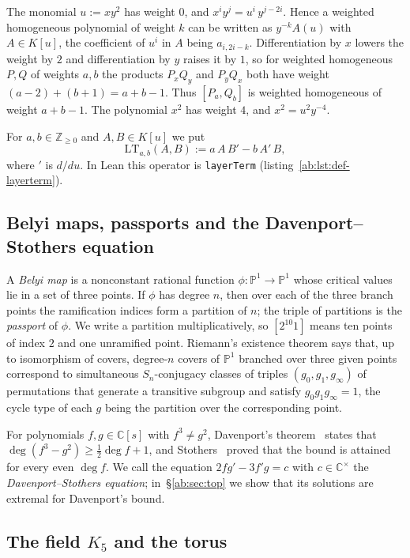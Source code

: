 \documentclass[a4paper,11pt]{article}
\theoremstyle{jsplain}
\theoremstyle{jsdef}
\theoremstyle{jsrem}
\begin{document}
The monomial $u:=xy^2$ has weight $0$, and $x^iy^j=u^i\,y^{j-2i}$. Hence a weighted homogeneous polynomial of weight $k$ can be written as $y^{-k}A(u)$ with $A\in K[u]$, the coefficient of $u^i$ in $A$ being $a_{i,2i-k}$. Differentiation by $x$ lowers the weight by $2$ and differentiation by $y$ raises it by $1$, so for weighted homogeneous $P,Q$ of weights $a,b$ the products $P_xQ_y$ and $P_yQ_x$ both have weight $(a-2)+(b+1)=a+b-1$. Thus $[P_a,Q_b]$ is weighted homogeneous of weight $a+b-1$. The polynomial $x^2$ has weight $4$, and $x^2=u^2y^{-4}$.

For $a,b\in\mathbb{Z}_{\ge0}$ and $A,B\in K[u]$ we put
\[
\mathrm{LT}_{a,b}(A,B):=a\,A\,B'-b\,A'\,B,
\]
where $'$ is $d/du$. In Lean this operator is \texttt{layerTerm} (listing~\ref{ab:lst:def-layerterm}).

\subsection{Belyi maps, passports and the Davenport--Stothers equation}

A \emph{Belyi map} is a nonconstant rational function $\phi\colon\mathbb{P}^1\to\mathbb{P}^1$ whose critical values lie in a set of three points. If $\phi$ has degree $n$, then over each of the three branch points the ramification indices form a partition of $n$; the triple of partitions is the \emph{passport} of $\phi$. We write a partition multiplicatively, so $[2^{10}1]$ means ten points of index $2$ and one unramified point. Riemann's existence theorem says that, up to isomorphism of covers, degree-$n$ covers of $\mathbb{P}^1$ branched over three given points correspond to simultaneous $S_n$-conjugacy classes of triples $(g_0,g_1,g_\infty)$ of permutations that generate a transitive subgroup and satisfy $g_0g_1g_\infty=1$, the cycle type of each $g$ being the partition over the corresponding point.

For polynomials $f,g\in\mathbb{C}[s]$ with $f^3\neq g^2$, Davenport's theorem~\cite{Davenport} states that $\deg(f^3-g^2)\ge\tfrac12\deg f+1$, and Stothers~\cite{Stothers} proved that the bound is attained for every even $\deg f$. We call the equation $2fg'-3f'g=c$ with $c\in\mathbb{C}^\times$ the \emph{Davenport--Stothers equation}; in~\S\ref{ab:sec:top} we show that its solutions are extremal for Davenport's bound.

\subsection{The field \texorpdfstring{$K_5$}{K5} and the torus}
\end{document}
